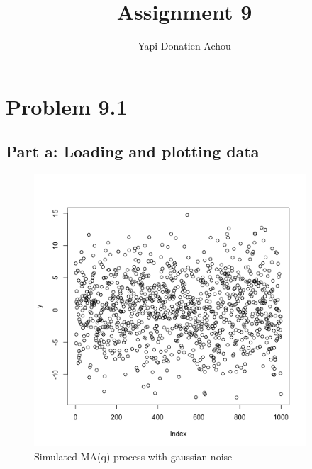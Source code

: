 \documentclass[11pt, oneside]{article}   	%
\title{Assignment 9}
\author{Yapi Donatien Achou}
\begin{document}
\maketitle
\section{Problem 9.1}
\subsection{Part a: Loading and plotting data}
\begin{figure}[H] %
   \centering
   \includegraphics[width=4in]{maq} 
   \caption{Simulated MA(q) process with gaussian noise}
   \label{fig:example}
\end{figure}
\end{document}
